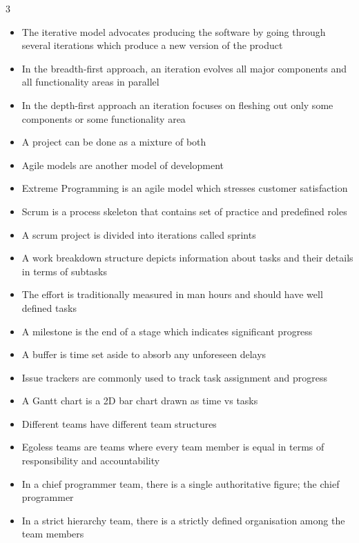 \documentclass[10pt, landscape]{article}
\begin{document}
\begin{multicols*}{3}
\begin{itemize}
    \item The iterative model advocates producing the software by going through several iterations which produce a new version of the product
    \item In the breadth-first approach, an iteration evolves all major components and all functionality areas in parallel
    \item In the depth-first approach an iteration focuses on fleshing out only some components or some functionality area
    \item A project can be done as a mixture of both
    \item Agile models are another model of development
    \item Extreme Programming is an agile model which stresses customer satisfaction
    \item Scrum is a process skeleton that contains set of practice and predefined roles
    \item A scrum project is divided into iterations called sprints
    \item A work breakdown structure depicts information about tasks and their details in terms of subtasks
    \item The effort is traditionally measured in man hours and should have well defined tasks
    \item A milestone is the end of a stage which indicates significant progress
    \item A buffer is time set aside to absorb any unforeseen delays
    \item Issue trackers are commonly used to track task assignment and progress
    \item A Gantt chart is a 2D bar chart drawn as time vs tasks
    \item Different teams have different team structures
    \item Egoless teams are teams where every team member is equal in terms of responsibility and accountability
    \item In a chief programmer team, there is a single authoritative figure; the chief programmer
    \item In a strict hierarchy team, there is a strictly defined organisation among the team members
\end{itemize}


\end{multicols*}
\end{document}

